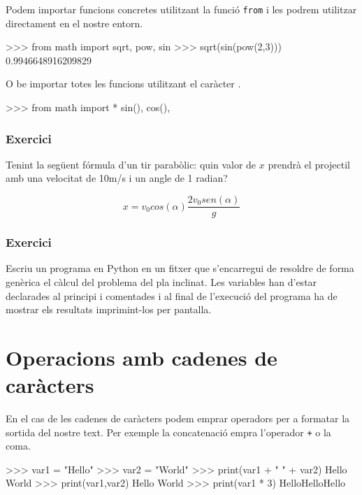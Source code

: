 Podem importar funcions concretes utilitzant la funció {\tt from} i les podrem utilitzar directament en el nostre entorn.

\begin{blockcode}
>>> from math import sqrt, pow, sin
>>> sqrt(sin(pow(2,3)))
0.9946648916209829
\end{blockcode}

O be importar totes les funcions utilitzant el caràcter {\tt *}.

\begin{blockcode}
>>> from math import *
sin(), cos(), 
\end{blockcode}




\subsubsection*{Exercici } 

Tenint la següent fórmula d'un tir parabòlic: quin valor de $x$ prendrà el projectil amb una velocitat de 10m/s i un angle de 1 radian?

\[
x = v_0 cos(\alpha) \frac{2 v_0 sen(\alpha)}{g}
\]



\subsubsection*{Exercici } 

Escriu un programa en Python en un fitxer que s'encarregui de resoldre de forma genèrica el càlcul del problema del pla inclinat. Les variables han d'estar declarades al principi i comentades i al final de l'execució del programa ha de mostrar els resultats imprimint-los per pantalla.




\section{Operacions amb cadenes de caràcters}

En el cas de les cadenes de caràcters podem emprar operadors per a formatar la sortida del nostre text. Per exemple la concatenació empra l'operador {\tt +} o la coma.


\begin{blockcode}
>>> var1 = "Hello"
>>> var2 = "World"
>>> print(var1 + " " + var2)
Hello World
>>> print(var1,var2)
Hello World
>>> print(var1 * 3)
HelloHelloHello
\end{blockcode}	


